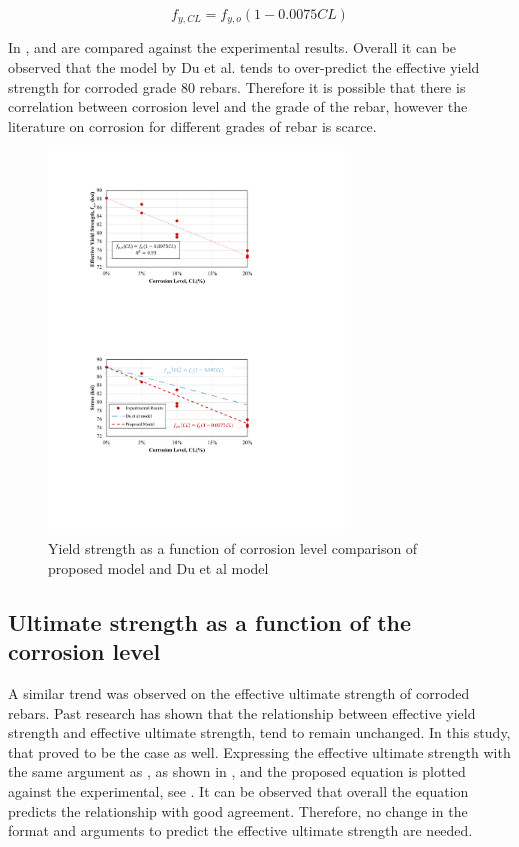 \begin{equation}
    f_{y,CL} = f_{y,o}(1-0.0075CL)
\label{eq.Du_Fy_vs_CL_ch4}
\end{equation}

In ,  and  are compared against the experimental results. Overall it can be observed that the model by Du et al. \cite{Du2005} tends to over-predict the effective yield strength for corroded grade 80 rebars. Therefore it is possible that there is correlation between corrosion level and the grade of the rebar, however the literature on corrosion for different grades of rebar is scarce. 

\begin{figure}[htbp]
	\centering
	\includegraphics[width=0.7\textwidth]{VAC Thesis 2.0/Chapter-4/figs/TensionTest_results_3_proposedmodel.pdf}
	\caption{Yield strength as a function of corrosion level comparison of proposed model and Du et al model \cite{Du2005}}
	\label{fig:Calderon_vs_Du}
\end{figure}

\newpage

\subsection{Ultimate strength as a function of the corrosion level}

A similar trend was observed on the effective ultimate strength of corroded rebars. Past research has shown that the relationship between effective yield strength and effective ultimate strength, tend to remain unchanged. In this study, that proved to be the case as well. Expressing the effective ultimate strength with the same argument as , as shown in , and the proposed equation is plotted against the experimental, see . It can be observed that overall the equation predicts the relationship with good agreement. Therefore, no change in the format and arguments to predict the effective ultimate strength are needed.

